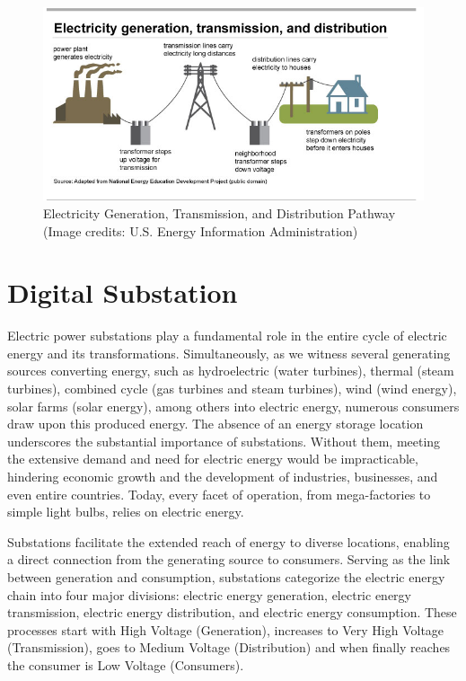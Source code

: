 \begin{figure}[tbh]
	\centering
	\includegraphics[width=\textwidth, keepaspectratio]{ch1/assets/Way_of_electricity.png}
	\caption{Electricity Generation, Transmission, and Distribution Pathway (Image credits: U.S. Energy Information Administration)}
	\label{fig:electricity-pathway}
\end{figure}

\section{Digital Substation}
Electric power substations play a fundamental role in the entire cycle of electric energy and its transformations. Simultaneously, as we witness several generating sources converting energy, such as hydroelectric (water turbines), thermal (steam turbines), combined cycle (gas turbines and steam turbines), wind (wind energy), solar farms (solar energy), among others into electric energy, numerous consumers draw upon this produced energy. The absence of an energy storage location underscores the substantial importance of substations. Without them, meeting the extensive demand and need for electric energy would be impracticable, hindering economic growth and the development of industries, businesses, and even entire countries. Today, every facet of operation, from mega-factories to simple light bulbs, relies on electric energy.

Substations facilitate the extended reach of energy to diverse locations, enabling a direct connection from the generating source to consumers. Serving as the link between generation and consumption, substations categorize the electric energy chain into four major divisions: electric energy generation, electric energy transmission, electric energy distribution, and electric energy consumption. These processes start with High Voltage (Generation), increases to Very High Voltage (Transmission), goes to Medium Voltage (Distribution) and when finally reaches the consumer is Low Voltage (Consumers).

